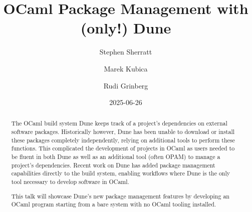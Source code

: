\documentclass{article}
\title{\bf OCaml Package Management with (only!) Dune}
\date{2025-06-26}
\author[1]{Stephen Sherratt}
\author[1]{Marek Kubica}
\author[1]{Rudi Grinberg}
\affil[1]{Tarides}
\begin{document}
    \maketitle

    \begin{abstract}
        The OCaml build system Dune keeps track of a project's dependencies on
        external software packages. Historically however, Dune has been unable
        to download or install these packages completely independently, relying
        on additional tools to perform these functions. This complicated the
        development of projects in OCaml as users needed to be fluent in both
        Dune as well as an additional tool (often OPAM) to manage a project's
        dependencies. Recent work on Dune has added package management
        capabilities directly to the build system, enabling workflows where Dune
        is the only tool necessary to develop software in OCaml.

        This talk will showcase Dune's new package management features by
        developing an OCaml program starting from a bare system with no OCaml
        tooling installed.
    \end{abstract}
\end{document}
